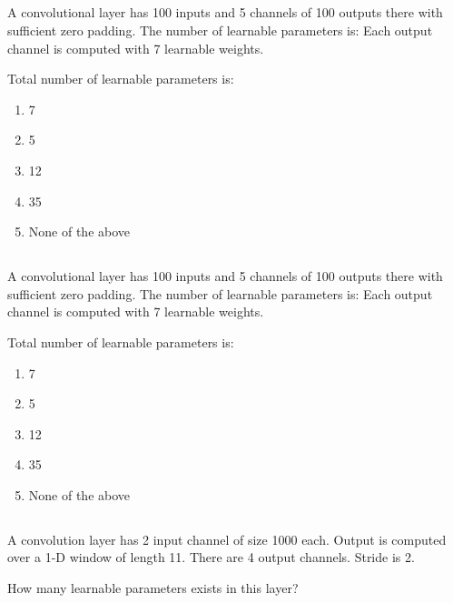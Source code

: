 
\begin{frame}
\section{}
A convolutional layer has 100 inputs
and 5 channels of 100 outputs there with sufficient
zero padding. The number of learnable parameters is:
Each output channel is computed with 7 learnable weights.

Total number of learnable parameters is:

\begin{enumerate}[label=(\Alph*)]
\item 7
\item 5
\item 12
\item 35    %
\item None of the above   %
\end{enumerate}

\end{frame}

\begin{frame}
\section{}
A convolutional layer has 100 inputs and
5 channels of 100 outputs there with sufficient
zero padding. The number of learnable parameters is:
Each output channel is computed with 7 learnable weights.

Total number of learnable parameters is:

\begin{enumerate}[label=(\Alph*)]
\item 7
\item 5
\item 12
\item 35    %
\item None of the above   %
\end{enumerate}
\end{frame}


\begin{frame}
\section{}
A convolution layer has 2 input channel of size 1000 each. Output is computed over a 1-D window of length 11. There are 4 output channels. Stride is 2.

    How many learnable parameters exists in this layer?


\end{frame}



